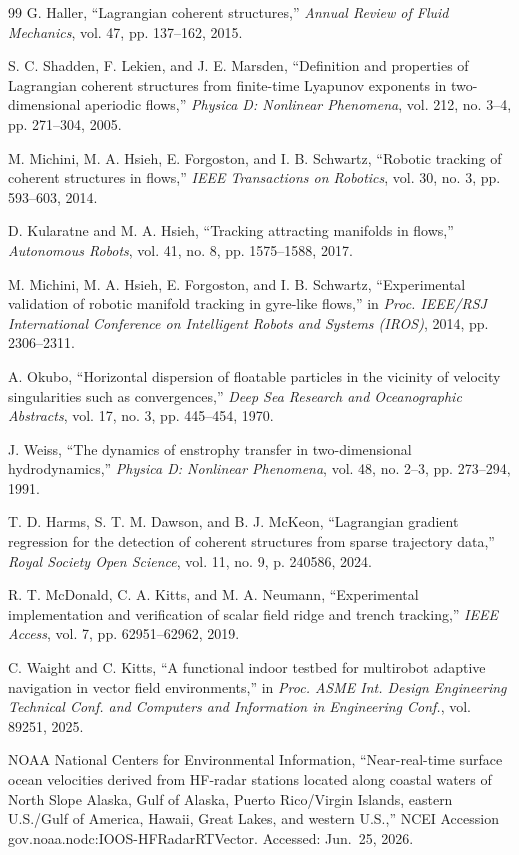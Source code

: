 \documentclass[lettersize,journal]{IEEEtran}
\begin{document}
\begin{thebibliography}{99}
 G. Haller, ``Lagrangian coherent structures,'' \textit{Annual Review of Fluid Mechanics}, vol. 47, pp. 137--162, 2015.

 S. C. Shadden, F. Lekien, and J. E. Marsden, ``Definition and properties of Lagrangian coherent structures from finite-time Lyapunov exponents in two-dimensional aperiodic flows,'' \textit{Physica D: Nonlinear Phenomena}, vol. 212, no. 3--4, pp. 271--304, 2005.

 M. Michini, M. A. Hsieh, E. Forgoston, and I. B. Schwartz, ``Robotic tracking of coherent structures in flows,'' \textit{IEEE Transactions on Robotics}, vol. 30, no. 3, pp. 593--603, 2014.

 D. Kularatne and M. A. Hsieh, ``Tracking attracting manifolds in flows,'' \textit{Autonomous Robots}, vol. 41, no. 8, pp. 1575--1588, 2017.

 M. Michini, M. A. Hsieh, E. Forgoston, and I. B. Schwartz, ``Experimental validation of robotic manifold tracking in gyre-like flows,'' in \textit{Proc. IEEE/RSJ International Conference on Intelligent Robots and Systems (IROS)}, 2014, pp. 2306--2311.

 A. Okubo, ``Horizontal dispersion of floatable particles in the vicinity of velocity singularities such as convergences,'' \textit{Deep Sea Research and Oceanographic Abstracts}, vol. 17, no. 3, pp. 445--454, 1970.

 J. Weiss, ``The dynamics of enstrophy transfer in two-dimensional hydrodynamics,'' \textit{Physica D: Nonlinear Phenomena}, vol. 48, no. 2--3, pp. 273--294, 1991.

 T. D. Harms, S. T. M. Dawson, and B. J. McKeon, ``Lagrangian gradient regression for the detection of coherent structures from sparse trajectory data,'' \textit{Royal Society Open Science}, vol. 11, no. 9, p. 240586, 2024.

 R. T. McDonald, C. A. Kitts, and M. A. Neumann, ``Experimental implementation and verification of scalar field ridge and trench tracking,'' \textit{IEEE Access}, vol. 7, pp. 62951--62962, 2019.

 C. Waight and C. Kitts, ``A functional indoor testbed for multirobot adaptive navigation in vector field environments,'' in \textit{Proc. ASME Int. Design Engineering Technical Conf. and Computers and Information in Engineering Conf.}, vol. 89251, 2025.

 NOAA National Centers for Environmental Information, ``Near-real-time surface ocean velocities derived from HF-radar stations located along coastal waters of North Slope Alaska, Gulf of Alaska, Puerto Rico/Virgin Islands, eastern U.S./Gulf of America, Hawaii, Great Lakes, and western U.S.,'' NCEI Accession gov.noaa.nodc:IOOS-HFRadarRTVector. Accessed: Jun.\ 25, 2026.

\end{thebibliography}
\end{document}

